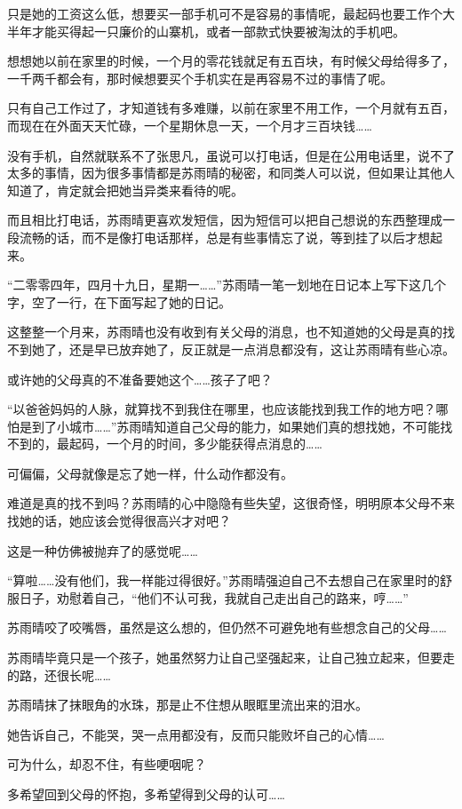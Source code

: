 只是她的工资这么低，想要买一部手机可不是容易的事情呢，最起码也要工作个大半年才能买得起一只廉价的山寨机，或者一部款式快要被淘汰的手机吧。

想想她以前在家里的时候，一个月的零花钱就足有五百块，有时候父母给得多了，一千两千都会有，那时候想要买个手机实在是再容易不过的事情了呢。

只有自己工作过了，才知道钱有多难赚，以前在家里不用工作，一个月就有五百，而现在在外面天天忙碌，一个星期休息一天，一个月才三百块钱……

没有手机，自然就联系不了张思凡，虽说可以打电话，但是在公用电话里，说不了太多的事情，因为很多事情都是苏雨晴的秘密，和同类人可以说，但如果让其他人知道了，肯定就会把她当异类来看待的呢。

而且相比打电话，苏雨晴更喜欢发短信，因为短信可以把自己想说的东西整理成一段流畅的话，而不是像打电话那样，总是有些事情忘了说，等到挂了以后才想起来。

“二零零四年，四月十九日，星期一……”苏雨晴一笔一划地在日记本上写下这几个字，空了一行，在下面写起了她的日记。

这整整一个月来，苏雨晴也没有收到有关父母的消息，也不知道她的父母是真的找不到她了，还是早已放弃她了，反正就是一点消息都没有，这让苏雨晴有些心凉。

或许她的父母真的不准备要她这个……孩子了吧？

“以爸爸妈妈的人脉，就算找不到我住在哪里，也应该能找到我工作的地方吧？哪怕是到了小城市……”苏雨晴知道自己父母的能力，如果她们真的想找她，不可能找不到的，最起码，一个月的时间，多少能获得点消息的……

可偏偏，父母就像是忘了她一样，什么动作都没有。

难道是真的找不到吗？苏雨晴的心中隐隐有些失望，这很奇怪，明明原本父母不来找她的话，她应该会觉得很高兴才对吧？

这是一种仿佛被抛弃了的感觉呢……

“算啦……没有他们，我一样能过得很好。”苏雨晴强迫自己不去想自己在家里时的舒服日子，劝慰着自己，“他们不认可我，我就自己走出自己的路来，哼……”

苏雨晴咬了咬嘴唇，虽然是这么想的，但仍然不可避免地有些想念自己的父母……

苏雨晴毕竟只是一个孩子，她虽然努力让自己坚强起来，让自己独立起来，但要走的路，还很长呢……

苏雨晴抹了抹眼角的水珠，那是止不住想从眼眶里流出来的泪水。

她告诉自己，不能哭，哭一点用都没有，反而只能败坏自己的心情……

可为什么，却忍不住，有些哽咽呢？

多希望回到父母的怀抱，多希望得到父母的认可……

